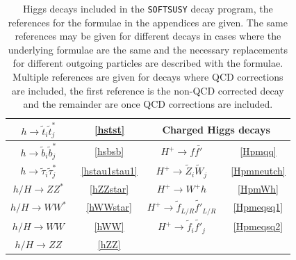 \documentclass[final,3p,times,pdflatex]{elsarticle}
\begin{document}
\begin{center}
\begin{table}
\begin{tabular}{|c|c|c|c|}
$h \rightarrow \tilde{t}_{i} \tilde{t}_{j}^*$ &~\ref{hstst} & \multicolumn{2}{c|}{\bf{Charged Higgs decays} } \\ \hline
$h \rightarrow \tilde{b}_i {\tilde{b}}_j^*$ &~\ref{hsbsb} & $H^+ \rightarrow f \bar{f'}$ &~\ref{Hpmqq} \\ \hline
$h \rightarrow \tilde{\tau}_i {\tilde{\tau}}_j^*$ &~\ref{hstau1stau1} & $H^+ \rightarrow \tilde{Z}_i \tilde{W}_j$ &~\ref{Hpmneutch} \\ \hline
$h/H \rightarrow ZZ^*$ &~\ref{hZZstar} & $H^+ \rightarrow W^+ h$ &~\ref{HpmWh} \\ \hline
$h/H \rightarrow WW^*$ &~\ref{hWWstar} & $H^+ \rightarrow \tilde{f}_{L/R} \tilde{f'}_{L/R}$ &~\ref{Hpmeqsq1} \\ \hline
$h/H \rightarrow WW$ &~\ref{hWW} & $H^+ \rightarrow \tilde{f}_i \tilde{f'}_j$ &~\ref{Hpmeqsq2} \\ \hline
$h/H \rightarrow ZZ$ &~\ref{hZZ} & & \\ \hline
\end{tabular}
\caption{Higgs decays included in the {\tt SOFTSUSY} decay program, the references for the formulae in the appendices are given. The same references may be given for different decays in cases where the underlying formulae are the same and the necessary replacements for different outgoing particles are described with the formulae. Multiple references are given for decays where QCD corrections are included, the first reference is the non-QCD corrected decay and the remainder are once QCD corrections are included.}
\label{Higgsdecaysreftable}
\end{table}
\end{center}
\end{document}

